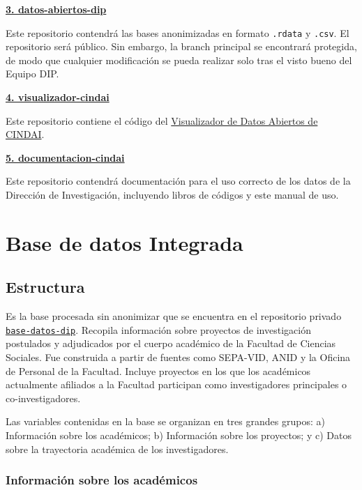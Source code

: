 \documentclass[
  spanish,
  letterpaper,
  DIV=11,
  numbers=noendperiod]{scrreprt}
\begin{document}
\href{https://github.com/facso-investigacion/datos-abiertos-dip}{\textbf{3.
datos-abiertos-dip}}

Este repositorio contendrá las bases anonimizadas en formato
\texttt{.rdata} y \texttt{.csv}. El repositorio será público. Sin
embargo, la branch principal se encontrará protegida, de modo que
cualquier modificación se pueda realizar solo tras el visto bueno del
Equipo DIP.

\href{https://github.com/facso-investigacion/visualizador-cindai}{\textbf{4.
visualizador-cindai}}

Este repositorio contiene el código del
\href{https://dip-facso.shinyapps.io/datos-abiertos-CINDAI/\#inicio}{Visualizador
de Datos Abiertos de CINDAI}.

\href{https://github.com/facso-investigacion/documentacion-cindai}{\textbf{5.
documentacion-cindai}}

Este repositorio contendrá documentación para el uso correcto de los
datos de la Dirección de Investigación, incluyendo libros de códigos y
este manual de uso.


\chapter{Base de datos Integrada}\label{sec-base}

\section{Estructura}\label{estructura}

Es la base procesada sin anonimizar que se encuentra en el repositorio
privado
\href{https://github.com/facso-investigacion/bases-datos-dip}{\texttt{base-datos-dip}}.
Recopila información sobre proyectos de investigación postulados y
adjudicados por el cuerpo académico de la Facultad de Ciencias Sociales.
Fue construida a partir de fuentes como SEPA-VID, ANID y la Oficina de
Personal de la Facultad. Incluye proyectos en los que los académicos
actualmente afiliados a la Facultad participan como investigadores
principales o co-investigadores.

Las variables contenidas en la base se organizan en tres grandes grupos:
a) Información sobre los académicos; b) Información sobre los proyectos;
y c) Datos sobre la trayectoria académica de los investigadores.

\subsection{Información sobre los
académicos}\label{informaciuxf3n-sobre-los-acaduxe9micos}
\end{document}
